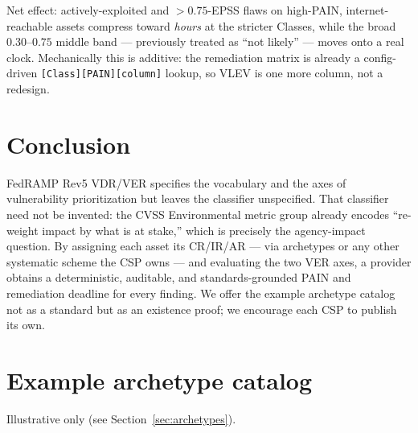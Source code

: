 \documentclass[11pt]{article}
\newcommand{\code}[1]{\texttt{#1}}
\begin{document}
\noindent Net effect: actively-exploited and $>0.75$-EPSS flaws on high-PAIN,
internet-reachable assets compress toward \emph{hours} at the stricter Classes, while
the broad $0.30$--$0.75$ middle band --- previously treated as ``not likely'' ---
moves onto a real clock. Mechanically this is additive: the remediation matrix is
already a config-driven \code{[Class][PAIN][column]} lookup, so VLEV is one more
column, not a redesign.

\section{Conclusion}
FedRAMP Rev5 VDR/VER specifies the vocabulary and the axes of vulnerability
prioritization but leaves the classifier unspecified. That classifier need not be
invented: the CVSS Environmental metric group already encodes ``re-weight impact by
what is at stake,'' which is precisely the agency-impact question. By assigning each
asset its CR/IR/AR --- via archetypes or any other systematic scheme the CSP owns
--- and evaluating the two VER axes, a provider obtains a deterministic, auditable,
and standards-grounded PAIN and remediation deadline for every finding. We offer the
example archetype catalog not as a standard but as an existence proof; we encourage
each CSP to publish its own.

\appendix
\section{Example archetype catalog}
\label{app:catalog}
Illustrative only (see Section~\ref{sec:archetypes}).
\end{document}
